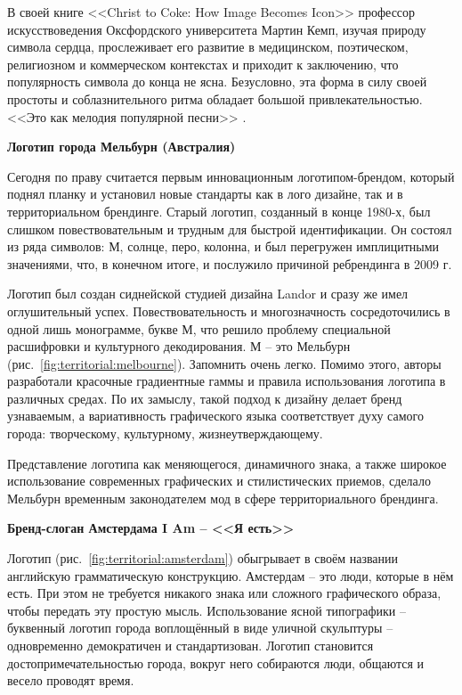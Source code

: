 В своей книге <<Christ to Coke: How Image Becomes Icon>> профессор искусствоведения Оксфордского
университета Мартин Кемп, изучая природу символа сердца, прослеживает его развитие в медицинском,
поэтическом, религиозном и коммерческом контекстах и приходит к заключению, что популярность символа
до конца не ясна. Безусловно, эта форма в силу своей простоты и соблазнительного ритма обладает
большой привлекательностью. <<Это как мелодия популярной песни>> \autocite[][110]{kemp2011christ}.

\textbf{Логотип города Мельбурн (Австралия)}

Сегодня по праву считается первым инновационным логотипом-брендом, который поднял планку и установил
новые стандарты  как в лого дизайне, так и в территориальном брендинге. Старый логотип, созданный в
конце 1980-х, был слишком повествовательным и трудным для быстрой идентификации. Он состоял из ряда
символов: М, солнце, перо, колонна, и был перегружен имплицитными значениями, что, в конечном итоге,
и послужило причиной ребрендинга в 2009 г.

Логотип был создан сиднейской студией дизайна  Landor  и сразу же имел оглушительный
успех. Повествовательность и многозначность сосредоточились в одной лишь монограмме, букве М, что
решило проблему специальной расшифровки и культурного декодирования. М -- это Мельбурн
(рис.~\ref{fig:territorial:melbourne}). Запомнить очень легко. Помимо этого, авторы разработали
красочные градиентные гаммы и правила использования логотипа в различных средах. По их замыслу,
такой подход к дизайну делает бренд узнаваемым, а вариативность графического языка соответствует
духу самого города: творческому, культурному, жизнеутверждающему.

Представление логотипа как меняющегося, динамичного знака, а также широкое использование современных
графических и стилистических приемов, сделало Мельбурн временным законодателем мод в сфере
территориального брендинга.

\textbf{Бренд-слоган Амстердама I Am -- <<Я есть>>}

Логотип (рис.~\ref{fig:territorial:amsterdam}) обыгрывает в своём названии английскую грамматическую
конструкцию.  Амстердам -- это люди, которые в нём есть. При этом не требуется никакого знака или
сложного графического образа, чтобы передать эту простую мысль. Использование ясной типографики --
буквенный логотип города воплощённый в виде уличной скульптуры -- одновременно демократичен и
стандартизован. Логотип становится достопримечательностью города, вокруг него собираются люди,
общаются и весело проводят время.

